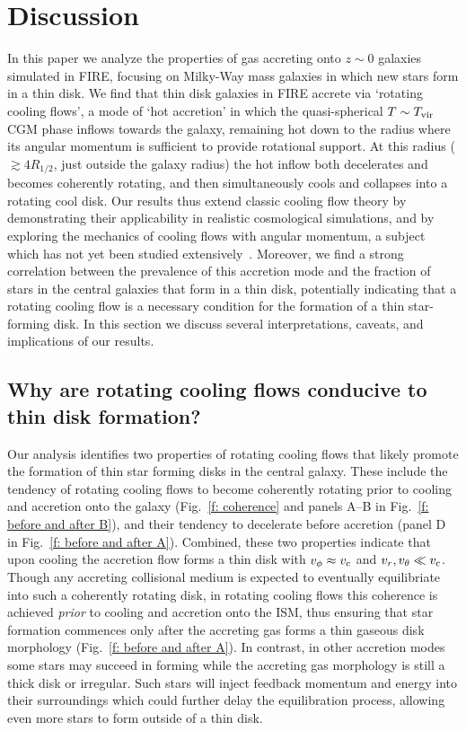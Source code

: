\documentclass[fleqn,usenatbib]{mnras}
\newcommand{\Tvir}{T_{\rm vir}}
\begin{document}
\section{Discussion}
\label{s: discussion}

In this paper we analyze the properties of gas accreting onto $z\sim0$ galaxies simulated in FIRE, focusing on Milky-Way mass galaxies in which new stars form in a thin disk. 
We find that thin disk galaxies in FIRE accrete via `rotating cooling flows', a mode of `hot accretion' in which the quasi-spherical $T\sim\Tvir$ CGM phase inflows towards the galaxy, remaining hot down to the radius where its angular momentum is sufficient to provide rotational support.
At this radius ($\gtrsim 4 R_{1/2}$, just outside the galaxy radius) the hot inflow both decelerates and becomes coherently rotating, and then simultaneously cools and collapses into a rotating cool disk.
Our results thus extend classic cooling flow theory by demonstrating their applicability in realistic cosmological simulations, and by exploring the mechanics of cooling flows with angular momentum, a subject which has not yet been studied extensively~\citep[c.f.][]{Cowie1980, Stern2019}.
Moreover, we find a strong correlation between the prevalence of this accretion mode and the fraction of stars in the central galaxies that form in a thin disk, potentially indicating that a rotating cooling flow is a necessary condition for the formation of a thin star-forming disk.
In this section we discuss several interpretations, caveats, and implications of our results. 

\subsection{Why are rotating cooling flows conducive to thin disk formation?}
\label{s: why CFs thin disks}

Our analysis identifies two properties of rotating cooling flows that likely promote the formation of thin star forming disks in the central galaxy.
These include the tendency of rotating cooling flows to become coherently rotating prior to cooling and accretion onto the galaxy (Fig.~\ref{f: coherence} and panels A--B in Fig.~\ref{f: before and after B}),
and their tendency to decelerate before accretion (panel D in Fig.~\ref{f: before and after A}).
Combined, these two properties indicate that upon cooling the accretion flow forms a thin disk with $v_\phi\approx v_{\rm c}$ and $v_r, v_\theta \ll v_{\rm c}$. 
Though any accreting collisional medium is expected to eventually equilibriate into such a coherently rotating disk, in rotating cooling flows this coherence is achieved \textit{prior} to cooling and accretion onto the ISM, thus ensuring that star formation commences only after the accreting gas forms a thin gaseous disk morphology (Fig.~\ref{f: before and after A}).
In contrast, in other accretion modes some stars may succeed in forming while the accreting gas morphology is still a thick disk or irregular.
Such stars will inject feedback momentum and energy into their surroundings which could further delay the  equilibration process, allowing even more stars to form outside of a thin disk. 
\end{document}
